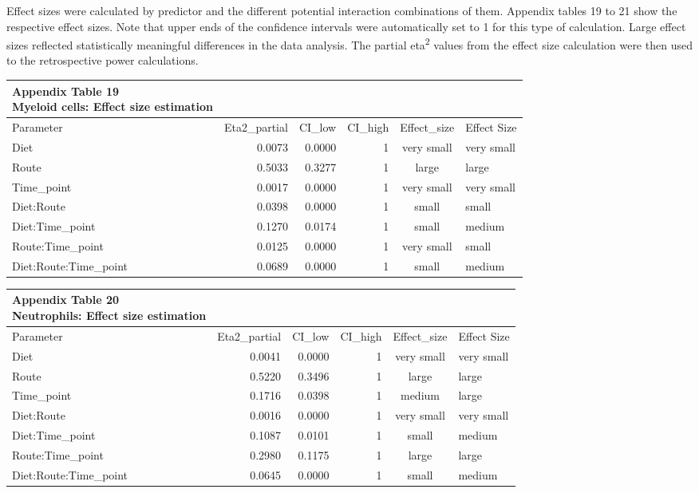 \documentclass[
  12pt,
  letterpaper,
]{article}
\begin{document}
Effect sizes were calculated by predictor and the different potential interaction combinations of them. Appendix tables 19 to 21 show the respective effect sizes. Note that upper ends of the confidence intervals were automatically set to 1 for this type of calculation. Large effect sizes reflected statistically meaningful differences in the data analysis. The partial eta\textsuperscript{2} values from the effect size calculation were then used to the retrospective power calculations.

\begin{longtable}{lrrrcl}
\caption*{
{\large \textbf{Appendix Table 19}} \\ 
{\small \textbf{Myeloid cells: Effect size estimation}}
} \\ 
\toprule
Parameter & Eta2\_partial & CI\_low & CI\_high & Effect\_size & Effect Size \\ 
\midrule\addlinespace[2.5pt]
Diet & 0.0073 & 0.0000 & 1 & very small & very small \\ 
Route & 0.5033 & 0.3277 & 1 & large & large \\ 
Time\_point & 0.0017 & 0.0000 & 1 & very small & very small \\ 
Diet:Route & 0.0398 & 0.0000 & 1 & small & small \\ 
Diet:Time\_point & 0.1270 & 0.0174 & 1 & small & medium \\ 
Route:Time\_point & 0.0125 & 0.0000 & 1 & very small & small \\ 
Diet:Route:Time\_point & 0.0689 & 0.0000 & 1 & small & medium \\ 
\bottomrule
\end{longtable}

\begin{longtable}{lrrrcl}
\caption*{
{\large \textbf{Appendix Table 20}} \\ 
{\small \textbf{Neutrophils: Effect size estimation}}
} \\ 
\toprule
Parameter & Eta2\_partial & CI\_low & CI\_high & Effect\_size & Effect Size \\ 
\midrule\addlinespace[2.5pt]
Diet & 0.0041 & 0.0000 & 1 & very small & very small \\ 
Route & 0.5220 & 0.3496 & 1 & large & large \\ 
Time\_point & 0.1716 & 0.0398 & 1 & medium & large \\ 
Diet:Route & 0.0016 & 0.0000 & 1 & very small & very small \\ 
Diet:Time\_point & 0.1087 & 0.0101 & 1 & small & medium \\ 
Route:Time\_point & 0.2980 & 0.1175 & 1 & large & large \\ 
Diet:Route:Time\_point & 0.0645 & 0.0000 & 1 & small & medium \\ 
\bottomrule
\end{longtable}
\end{document}
